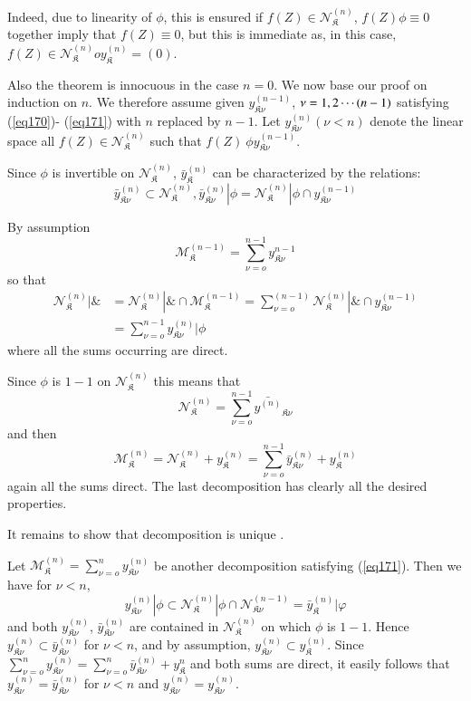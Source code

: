 Indeed, due to linearity of $\phi$, this is ensured if $f(Z) \in
\mathscr{N}^{(n)}_\mathfrak{K}$, $f(Z) \phi \equiv 0$ together imply that
$f(Z)\equiv 0$, but this is immediate as,  in this case, $f(Z) \in
\mathscr{N}^{(n)}_\mathfrak{K} o y^{(n)}_\mathfrak{K}=(0)$. 

Also the theorem is innocuous in the case $n =0$. We now base our proof
on induction on $n$. We therefore assume given
$y^{(n-1)}_{\mathfrak{K}\nu}$, $\nu=1,\break 2 \cdots (n-1)$ satisfying
(\ref{eq170})- (\ref{eq171}) with $n$ replaced by $n-1$. Let
$y^{(n)}_{\mathfrak{K} \nu}(\nu < n)$ denote the linear space all
$f(Z) \in  \mathscr{N}^{(n)}_\mathfrak{K} $ such that $f(Z) \ \phi
y^{(n-1)}_{\mathfrak{K} \nu}$.  

Since $\phi$ is invertible on $\mathscr{N}^{(n)}_\mathfrak{K}$,
$\bar{y}^{(n)}_\mathfrak{K}$ can be characterized by the
relations: 
$$ 
\bar{y}^{(n)}_{\mathfrak{K}\nu} \subset
\mathscr{N}^{(n)}_\mathfrak{K}, \bar{y}^{(n)}_{\mathfrak{K}\nu} | 
\phi = \mathscr{N}^{(n)}_\mathfrak{K} | \phi \cap
y^{(n-1)}_{\mathfrak{K}\nu} 
$$
 
By assumption\pageoriginale 
$$
\mathscr{M}^{(n-1)}_{\mathfrak{K}}= \sum^{n-1}_{\nu  =o}
y^{n-1}_{\mathfrak{K} \nu} 
$$
so that
\begin{align*}
\mathscr{N}^{(n)}_{\mathfrak{K}} | \& &=\mathscr{N}^{(n)}_{\mathfrak{K}}
| \& \cap \mathscr{M}^{(n-1)}_{\mathfrak{K}} = \sum_{\nu =o}^{(n-1)}
\mathscr{N}^{(n)}_\mathfrak{K} | \& \cap y^{(n-1)}_{\mathfrak{K}
  \nu}\\ 
&=\sum^{n-1}_{\nu =o} y^{(n)}_{\mathfrak{K}\nu} | \phi 
\end{align*}
where all the sums occurring are direct.

Since $\phi$ is $1-1$ on $\mathscr{N}^{(n)}_{\mathfrak{K}}$ this means
that 
$$
\mathscr{N}^{(n)}_{\mathfrak{K}}= \sum^{n-1}_{\nu=o}
\bar{y^{(n)}}_{\mathfrak{K} \nu} 
$$
and then
$$
\mathscr{M}^{(n)}_{\mathfrak{K}}= \mathscr{N}^{(n)}_{\mathfrak{K}} +
y^{(n)}_{\mathfrak{K}} = \sum^{n-1}_{\nu =o}
\bar{y}^{(n)}_{\mathfrak{K}\nu} + y^{(n)}_{\mathfrak{K}} 
$$
again all the sums direct. The last decomposition has clearly all the
desired properties. 

It  remains to show that decomposition is unique . 

Let $\mathscr{M}^{(n)}_{\mathfrak{K}}= \sum^n_{\nu =o}
y^{(n)}_{\mathfrak{K}\nu}$ be another decomposition satisfying
(\ref{eq171}). Then we have for $\nu < n$,  
$$
y^{(n)}_{\mathfrak{K}\nu} | \phi \subset
\mathscr{N}^{(n)}_{\mathfrak{K}} | \phi \cap
\mathscr{N}^{(n-1)}_{\mathfrak{K}\nu} =
\bar{y}^{(n)}_{\mathfrak{K}} | \varphi 
$$
and both $y^{(n)}_{\mathfrak{K}\nu}$,
$\bar{y}^{(n)}_{\mathfrak{K} \nu}$ are contained in
$\mathscr{N}^{(n)}_{\mathfrak{K}}$ on which $\phi$ is $1-1$. Hence
$y^{(n)}_{\mathfrak{K}\nu} \subset
\bar{y}^{(n)}_{\mathfrak{K} \nu}$ for $\nu < n$, and by
assumption, $y^{(n)}_{\mathfrak{K} \nu} \subset
y^{(n)}_{\mathfrak{K}}$. Since $\sum^n_{\nu=o}
y^{(n)}_{\mathfrak{K} \nu} =\sum^n_{\nu=o}
\bar{y}^{(n)}_{\mathfrak{K} \nu}  + y^n_{\mathfrak{K}}$ and
both sums are direct, it easily follows that
$y^{(n)}_{\mathfrak{K} \nu}= \bar{y}^{(n)}_{\mathfrak{K} \nu}$
for $\nu < n$ and $y^{(n)}_{\mathfrak{K} \nu}=
y^{(n)}_{\mathfrak{K} \nu}$. 

